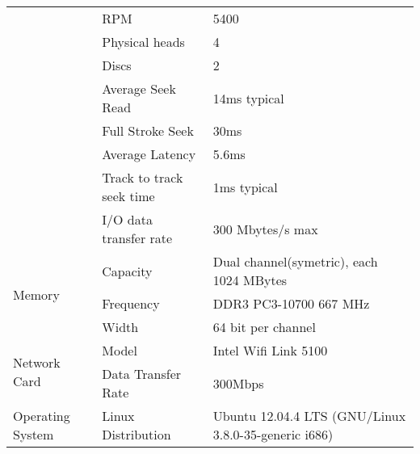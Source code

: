 \documentclass{article} %
\begin{document}
\begin{table}[h]
\begin{tabular}{|l|l|l|}
                                        & RPM                      & 5400                                                           \\ \cline{2-3}
                                        & Physical heads           & 4                                                              \\ \cline{2-3}
                                        & Discs                    & 2                                                              \\ \cline{2-3}
                                        & Average Seek Read        & 14ms typical                                                   \\ \cline{2-3}
                                        & Full Stroke Seek         & 30ms                                                           \\ \cline{2-3}
                                        & Average Latency          & 5.6ms                                                          \\ \cline{2-3}
                                        & Track to track seek time & 1ms typical                                                    \\ \cline{2-3}
                                        & I/O data transfer rate   & 300 Mbytes/s max                                               \\ \cline{2-3}
    \hline
    \multirow{3}{*}{Memory}             & Capacity                 & Dual channel(symetric), each 1024 MBytes                       \\ \cline{2-3}
                                        & Frequency                & DDR3 PC3-10700 667 MHz                                         \\ \cline{2-3}
                                        & Width                    & 64 bit per channel                                             \\ \cline{2-3}
    \hline
    \multirow{2}{*}{Network Card}       & Model                    & Intel Wifi Link 5100                                           \\ \cline{2-3}
                                        & Data Transfer Rate       & 300Mbps                                                        \\ \cline{2-3}
    \hline
    \multirow{1}{*}{Operating System}   & Linux Distribution       & Ubuntu 12.04.4 LTS (GNU/Linux 3.8.0-35-generic i686)           \\ \cline{2-3}
    \hline
  \end{tabular}
\end{table}
\end{document}
